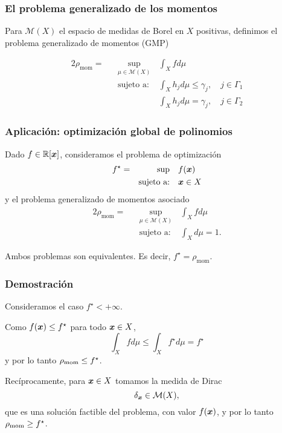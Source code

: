 \documentclass[aspectratio=169,12pt,spanish]{beamer}
\begin{document}

\begin{frame}

\frametitle{El problema generalizado de los momentos}

Para $\mathcal{M}(X)$ el espacio de medidas de Borel  en $X$ positivas, definimos el problema generalizado de momentos (GMP)

\begin{alignat*}{2}
  \rho_{\text{mom}} = & & \sup_{\mu \in \mathcal{M}(X)} & \int_X f d\mu   \\
   & & \text{sujeto a: } & \int_X h_j d\mu \le \gamma_j, \quad j \in \Gamma_1 \\
  &  & & \int_X h_j d\mu = \gamma_j, \quad j \in \Gamma_2
\end{alignat*}

\end{frame}


\begin{frame}

\frametitle{Aplicación: optimización global de polinomios}

Dado $f \in \mathbb{R}[\bm{x}]$, consideramos el problema de optimización
\begin{alignat*}{2}
  f^{\star} = & & \sup \quad & f(\bm{x})    \\
   & & \text{sujeto a:} \quad & \bm{x} \in X
\end{alignat*}
y el problema generalizado de momentos asociado
\begin{alignat*}{2}
  \rho_{\text{mom}} = & & \sup_{\mu \in \mathcal{M}(X)} & \int_X f d\mu   \\
   & & \text{sujeto a: } & \int_X d\mu = 1.
\end{alignat*}

\begin{theorem}
Ambos problemas son equivalentes. Es decir, $f^{\star} = \rho_{\text{mom}}$.
\end{theorem}


\end{frame}


\begin{frame}

\frametitle{Demostración}

Consideramos el caso $f^{\star} < + \infty$.

Como $f(\bm{x}) \le f^{\star}$ para todo $\bm{x} \in X$,
$$
\int_X f d\mu \le \int_X f^{\star} d\mu  = f^{\star}
$$
y por lo tanto ${\rho_{\text{mom}}} \le f^{\star}$.

Recíprocamente, para $\bm{x} \in X$ tomamos la medida de Dirac
$$\delta_{\bm{x}} \in {\mathcal{M}(X)},$$
que es una solución factible del problema, con valor $f(\bm{x})$, y por lo tanto ${\rho_{\text{mom}}} \ge f^{\star}$.

\end{frame}
\end{document}
